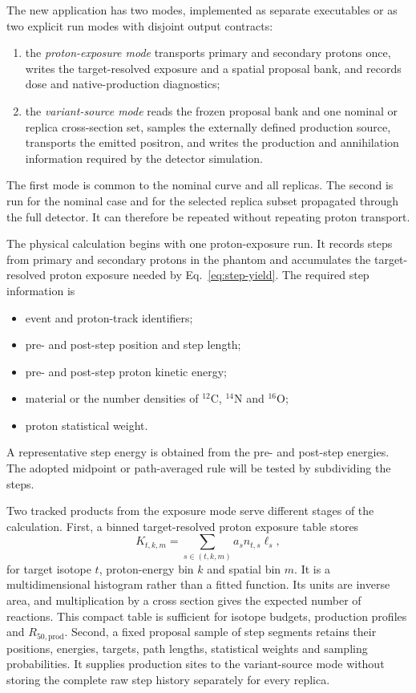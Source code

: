 \documentclass[11pt]{article}
\begin{document}
The new application has two modes, implemented as separate executables or as
two explicit run modes with disjoint output contracts:
\begin{enumerate}[nosep]
  \item the \emph{proton-exposure mode} transports primary and secondary
        protons once, writes the target-resolved exposure and a spatial
        proposal bank, and records dose and native-production diagnostics;
  \item the \emph{variant-source mode} reads the frozen proposal bank and one
        nominal or replica cross-section set, samples the externally defined
        production source, transports the emitted positron, and writes the
        production and annihilation information required by the detector
        simulation.
\end{enumerate}
The first mode is common to the nominal curve and all replicas.  The second is
run for the nominal case and for the selected replica subset propagated through
the full detector.  It can therefore be repeated without repeating proton
transport.

The physical calculation begins with one proton-exposure run.  It records
steps from primary and secondary protons in the phantom and accumulates the
target-resolved proton exposure needed by Eq.~\eqref{eq:step-yield}.  The
required step information is
\begin{itemize}[nosep]
  \item event and proton-track identifiers;
  \item pre- and post-step position and step length;
  \item pre- and post-step proton kinetic energy;
  \item material or the number densities of $^{12}$C, $^{14}$N and $^{16}$O;
  \item proton statistical weight.
\end{itemize}
A representative step energy is obtained from the pre- and post-step energies.
The adopted midpoint or path-averaged rule will be tested by subdividing the
steps.

Two tracked products from the exposure mode serve different stages of the calculation.
First, a binned target-resolved proton exposure table stores
\begin{equation}
 K_{t,k,m}=\sum_{s\in(t,k,m)}a_s n_{t,s}\ell_s,
 \label{eq:exposure-table}
\end{equation}
for target isotope $t$, proton-energy bin $k$ and spatial bin $m$.  It is a
multidimensional histogram rather than a fitted function.  Its units are
inverse area, and multiplication by a cross section gives the expected number
of reactions.  This compact table is sufficient for isotope budgets,
production profiles and $R_{50,\mathrm{prod}}$.  Second, a fixed proposal
sample of step segments retains their positions, energies, targets, path
lengths, statistical weights and sampling probabilities.  It supplies
production sites to the variant-source mode without storing the complete raw
step history separately for every replica.
\end{document}
